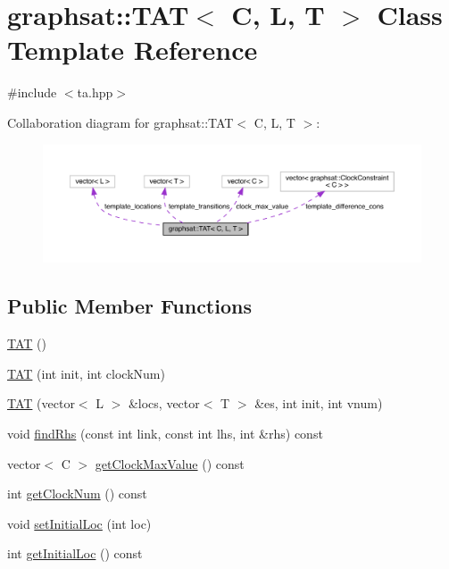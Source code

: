 \hypertarget{classgraphsat_1_1_t_a_t}{}\section{graphsat\+::T\+AT$<$ C, L, T $>$ Class Template Reference}
\label{classgraphsat_1_1_t_a_t}


{\ttfamily \#include $<$ta.\+hpp$>$}



Collaboration diagram for graphsat\+::T\+AT$<$ C, L, T $>$\+:
\nopagebreak
\begin{figure}[H]
\begin{center}
\leavevmode
\includegraphics[width=350pt]{classgraphsat_1_1_t_a_t__coll__graph}
\end{center}
\end{figure}
\subsection*{Public Member Functions}
\begin{DoxyCompactItemize}
\item 
\mbox{\hyperlink{classgraphsat_1_1_t_a_t_ae7843fd71a81d950f51df613609d2bff}{T\+AT}} ()
\item 
\mbox{\hyperlink{classgraphsat_1_1_t_a_t_a23534f2a60ceeebba0ef0789c305a834}{T\+AT}} (int init, int clock\+Num)
\item 
\mbox{\hyperlink{classgraphsat_1_1_t_a_t_a06ed502827dfedfe67faf43ba8368806}{T\+AT}} (vector$<$ L $>$ \&locs, vector$<$ T $>$ \&es, int init, int vnum)
\item 
void \mbox{\hyperlink{classgraphsat_1_1_t_a_t_aee96b682bbb17951496a296cd3a17c75}{find\+Rhs}} (const int link, const int lhs, int \&rhs) const
\item 
vector$<$ C $>$ \mbox{\hyperlink{classgraphsat_1_1_t_a_t_a4a49d6005d30685353f83c672e0a9c89}{get\+Clock\+Max\+Value}} () const
\item 
int \mbox{\hyperlink{classgraphsat_1_1_t_a_t_a471392530909266250bcd9cd4d397f48}{get\+Clock\+Num}} () const
\item 
void \mbox{\hyperlink{classgraphsat_1_1_t_a_t_a06f6fb8865991918c0f0ea713344a640}{set\+Initial\+Loc}} (int loc)
\item 
int \mbox{\hyperlink{classgraphsat_1_1_t_a_t_a214a257f7368c269c57a06133bd68fab}{get\+Initial\+Loc}} () const
\end{DoxyCompactItemize}
